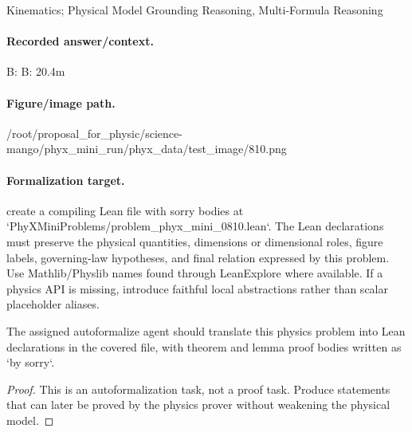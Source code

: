 Kinematics; Physical Model Grounding Reasoning, Multi-Formula Reasoning

\paragraph{Recorded answer/context.}
B: B: 20.4m

\paragraph{Figure/image path.}
/root/proposal\_for\_physic/science-mango/phyx\_mini\_run/phyx\_data/test\_image/810.png

\paragraph{Formalization target.}
create a compiling Lean file with sorry bodies at `PhyXMiniProblems/problem\_phyx\_mini\_0810.lean`. The Lean declarations must preserve the physical quantities, dimensions or dimensional roles, figure labels, governing-law hypotheses, and final relation expressed by this problem.
Use Mathlib/Physlib names found through LeanExplore where available. If a physics API is missing, introduce faithful local abstractions rather than scalar placeholder aliases.

\begin{theorem}
\label{thm:physics:phyx_mini_0810:target}
The assigned autoformalize agent should translate this physics problem into Lean declarations in the covered file, with theorem and lemma proof bodies written as `by sorry`.
\end{theorem}
\begin{proof}
This is an autoformalization task, not a proof task. Produce statements that can later be proved by the physics prover without weakening the physical model.
\end{proof}

